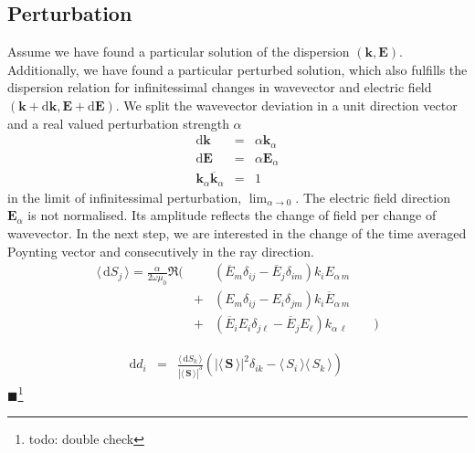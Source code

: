 \documentclass[12pt,a4paper,twoside,openright,BCOR10mm,headsepline,titlepage,abstracton,chapterprefix,final]{scrreprt}
\newcommand\Vector[1]{{\mathbf{#1}}}
\newcommand\vacuum{0}
\newcommand\wavenumber{k}
\newcommand\Wavevector{\Vector{\wavenumber}}
\newcommand\scalarEfield{E}
\newcommand\Efield{\Vector{\scalarEfield}}
\newcommand\vacuumpermeability{\scalarpermeability_{\vacuum}}
\newcommand\scalarpermeability{\mu}
\newcommand{\timeavg}[1]{{\langle\,#1\,\rangle}}
\newcommand{\remark}[1]{{\color{red}$\blacksquare$}\footnote{{\color{red}#1}}}
\newcommand\totald{\textrm{d}}
\begin{document}
\subsection{Perturbation}
Assume we have found a particular solution of the dispersion $( \Wavevector, \Efield )$.
Additionally, we have found a particular perturbed solution, 
which also fulfills the dispersion relation for infinitessimal changes 
in wavevector and electric field $( \Wavevector + \totald\Wavevector, \Efield + \totald\Efield)$.
We split the wavevector deviation in a unit direction vector and a real valued perturbation strength $\alpha$
\begin{eqnarray}
 \totald \Wavevector &=& \alpha \Wavevector_\alpha
 \\
 \totald \Efield &=& \alpha \Efield_\alpha
 \\
 \Wavevector_\alpha \overline{\Wavevector}_\alpha &=& 1
\end{eqnarray}
in the limit of infinitessimal perturbation, $\lim_{\alpha \rightarrow 0}$.
The electric field direction $\Efield_\alpha$ is not normalised.
Its amplitude reflects the change of field per change of wavevector.
In the next step, we are interested in the change of the time averaged Poynting vector and consecutively in the ray direction.
\begin{eqnarray}
 \timeavg{\totald S_j} =
  \frac{\alpha}{2\omega \vacuumpermeability} \Re 
  \bigg( &&
      (  \overline{\scalarEfield}_m \delta_{ij} - \overline{\scalarEfield}_j \delta_{im}  )
      \wavenumber_i \scalarEfield_{\alpha\,m}
  \nonumber \\
  &+& 
      (  \scalarEfield_m \delta_{ij} - \scalarEfield_i \delta_{jm}   )
      \wavenumber_i \overline{\scalarEfield}_{\alpha\,m}
  \nonumber \\
  &+& 
      (  \overline{\scalarEfield}_i \scalarEfield_i \delta_{j\ell} - \overline{\scalarEfield}_j \scalarEfield_\ell  )
      \wavenumber_{\alpha\,\ell}
  \qquad \bigg)
\end{eqnarray}





\begin{eqnarray}
 \totald d_i &=& \frac{  \timeavg{\totald S_k}}{|\timeavg{\Vector{S}}|^3} ( |\timeavg{\Vector{S}}|^2 \delta_{ik} - \timeavg{S_i} \timeavg{S_k} )\, 
 \label{eq:ray_direction_perturbation}
\end{eqnarray}
\remark{todo: double check}
\end{document}
